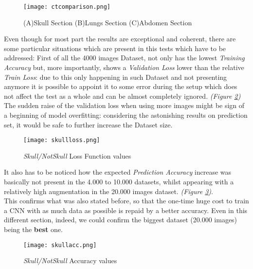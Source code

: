 \documentclass[../main.tex]{subfiles}
\begin{document}
\begin{figure}[H]
	\centering
	\texttt{[image: ctcomparison.png]}
	\caption{(A)Skull Section (B)Lungs Section (C)Abdomen Section}
	\label{fig:ctcomparison}
\end{figure}

\vspace*{1mm}
Even though for most part the results are exceptional and coherent, there are some particular situations which are present in this tests which have to be addressed: First of all the 4000 images Dataset, not only has the lowest \textit{Training Accuracy} but, more importantly, shows a \textit{Validation Loss} lower than the relative \textit{Train Loss}: due to this only happening in such Dataset and not presenting anymore it is possible to appoint it to some error during the setup which does not affect the test as a whole and can be almost completely ignored. \textit{(Figure \ref{fig:skulloss})} \\ The sudden raise of the validation loss when using more images might be sign of a beginning of model overfitting: considering the astonishing results on prediction set, it would be safe to further increase the Dataset size.

\begin{figure}[H]
	\centering
	\texttt{[image: skullloss.png]}
	\caption{\textit{Skull/NotSkull} Loss Function values}
	\label{fig:skulloss}
\end{figure}
\clearpage
\newpage
\vspace*{1mm}
It also has to be noticed how the expected \textit{Prediction Accuracy} increase was basically not present in the 4.000 to 10.000 datasets, whilst appearing with a relatively high augmentation in the 20.000 images dataset. \textit{(Figure \ref{fig:skullacc})}.\\
This confirms what was also stated before, so that the one-time huge cost to train a CNN with as much data as possible is repaid by a better accuracy. Even in this different section, indeed, we could confirm the biggest dataset (20.000 images) being the \textbf{best} one. 
\vspace*{5mm}
\begin{figure}[H]
	\centering
	\texttt{[image: skullacc.png]}
	\caption{\textit{Skull/NotSkull} Accuracy values}
	\label{fig:skullacc}
\end{figure}
\clearpage
\newpage
\end{document}
